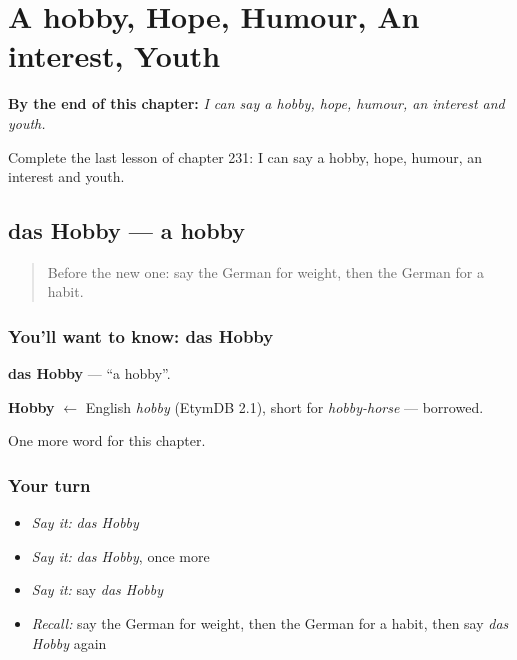 
\chapter{A hobby, Hope, Humour, An interest, Youth}
\label{ch:ge-a-hobby-hope-humour-an-interest-youth}

\begin{chapteropening}
\textbf{By the end of this chapter:} \emph{I can say a hobby, hope, humour, an interest and youth.}

Complete the last lesson of chapter 231: I can say a hobby, hope, humour, an interest and youth.
\end{chapteropening}

\section[das Hobby]{das Hobby — a hobby}

\label{lesson:GE-C231-hobby}



\begin{quote}
Before the new one: say the German for weight, then the German for a habit.
\end{quote}

\subsection*{You'll want to know: das Hobby}
\textbf{das Hobby} — \textquotedblleft{}a hobby\textquotedblright{}.

\begin{cousinweb}
\textbf{Hobby} $\leftarrow$ English \emph{hobby} (EtymDB 2.1), short for \emph{hobby-horse} — borrowed.
\end{cousinweb}

\begin{grammarlens}[title={What you've built}]
One more word for this chapter.
\end{grammarlens}

\subsection*{Your turn}
\begin{itemize}
\raggedright
  \item \emph{Say it:} \emph{das Hobby}
  \item \emph{Say it:} \emph{das Hobby}, once more
  \item \emph{Say it:} say \emph{das Hobby}
  \item \emph{Recall:} say the German for weight, then the German for a habit, then say \emph{das Hobby} again
\end{itemize}

